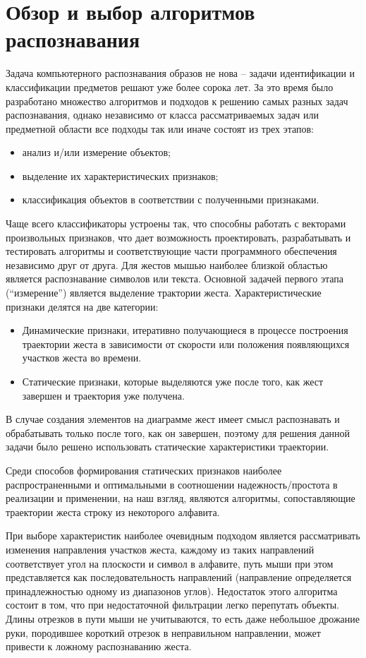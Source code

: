 \documentclass[a5paper]{article}
\begin{document}
\section{Обзор и выбор алгоритмов распознавания}
Задача компьютерного распознавания образов не нова -- задачи идентификации и классификации предметов решают уже более сорока лет. За это 
время было разработано множество алгоритмов и подходов к решению самых разных задач распознавания, однако независимо от класса 
рассматриваемых задач или предметной области все подходы так или иначе состоят из трех этапов: 
\begin{itemize}
  \item анализ и/или измерение объектов;
  \item выделение их характеристических признаков;
  \item классификация объектов в соответствии с полученными признаками.
\end{itemize}
Чаще всего классификаторы устроены так, что способны работать с векторами произвольных признаков, что дает возможность
проектировать, разрабатывать и тестировать алгоритмы и соответствующие части программного обеспечения независимо друг от друга.
Для жестов мышью наиболее близкой областью является распознавание символов или текста. Основной задачей первого этапа (``измерение'') 
является выделение трактории жеста. Характеристические признаки делятся на две категории:
\begin{itemize}
  \item Динамические признаки, итеративно получающиеся в процессе построения траектории жеста в зависимости от скорости или положения
появляющихся участков жеста во времени.
  \item Статические признаки, которые выделяются уже после того, как жест завершен и траектория уже получена.
\end{itemize}
В случае создания элементов на диаграмме жест имеет смысл распознавать и обрабатывать только после того, как он завершен, поэтому
для решения данной задачи было решено использовать статические характеристики траектории. 

Среди способов формирования статических признаков наиболее распространенными и оптимальными в соотношении надежность/простота в реализации и 
применении, на наш взгляд, являются алгоритмы, сопоставляющие траектории жеста строку из некоторого алфавита. 

При выборе характеристик наиболее очевидным подходом является рассматривать изменения направления участков жеста, каждому из таких направлений соответствует угол на плоскости и символ в 
алфавите, путь мыши при этом представляется как последовательность направлений (направление определяется принадлежностью одному из диапазонов 
углов). Недостаток этого алгоритма состоит в том, что при недостаточной фильтрации легко перепутать объекты. Длины отрезков в пути мыши не учитываются, 
то есть даже небольшое дрожание руки, породившее короткий отрезок в неправильном направлении, может привести к ложному распознаванию жеста.
\end{document}
